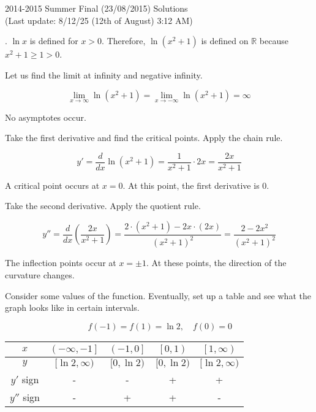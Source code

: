 \documentclass{article}
\begin{document}
\newpage

\begin{center}
2014-2015 Summer Final (23/08/2015) Solutions\\
(Last update: 8/12/25 (12th of August) 3:12 AM)
\end{center}

. $\ln x$ is defined for $x>0$. Therefore, $\ln\left(x^2+1\right)$ is defined on $\mathbb{R}$ because $x^2+1\geq1>0$.

\hfill

\noindent Let us find the limit at infinity and negative infinity.

\begin{equation*}\lim_{x\to\infty}\ln\left(x^2+1\right)=\lim_{x\to-\infty}\ln\left(x^2+1\right)=\infty\end{equation*}

\hfill

\noindent No asymptotes occur.

\hfill

\noindent Take the first derivative and find the critical points. Apply the chain rule.

\[y'=\frac d{dx}\ln\left(x^2+1\right)=\frac1{x^2+1}\cdot 2x=\frac{2x}{x^2+1}\]

\hfill

\noindent A critical point occurs at $x=0$. At this point, the first derivative is $0$.

\hfill

\noindent Take the second derivative. Apply the quotient rule.

\[y''=\frac d{dx}\left(\frac{2x}{x^2+1}\right)=\frac{2\cdot\left(x^2+1\right)-2x\cdot(2x)}{\left(x^2+1\right)^2}=\frac{2-2x^2}{\left(x^2+1\right)^2}\]

\hfill

\noindent The inflection points occur at $x=\pm1$. At these points, the direction of the curvature changes.

\hfill

\noindent Consider some values of the function. Eventually, set up a table and see what the graph looks like in certain intervals.

\begin{equation*}\,f\left(-1\right)=f\left(1\right)=\ln2,\quad f(0)=0\end{equation*}

\begin{center}
    \large
    \begin{tabular}{|c|cccc|} 
    \hline
        $x$&$\left(-\infty,-1\right]$&$\left(-1,0\right]$&$\left[0,1\right)$&$\left[1, \infty\right)$\\
        \hline
        $y$&$[\ln2,\infty)$&$[0,\ln2)$&$[0,\ln2)$&$[\ln2,\infty)$\\
        \hline
        $y'$ sign&-&-&+&+\\
        \hline
        $y''$ sign&-&+&+&-\\
        \hline
    \end{tabular}
\end{center}
\end{document}
